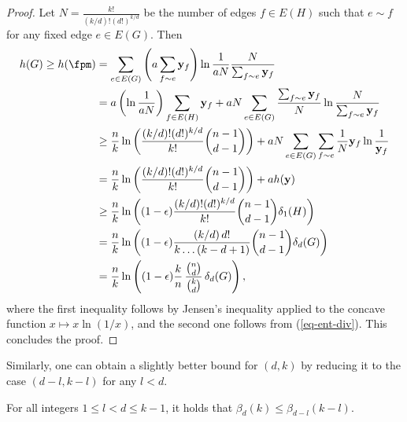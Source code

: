 \documentclass[11pt]{article}
\newcommand{\fpmy}{\mathbf{y}}
\begin{document}
\begin{proof}
    Let $N=\frac{k!}{(k/d)!(d!)^{k/d}}$ be the number of edges $f\in E(H)$ such that $e\sim f$ for any fixed edge $e\in E(G)$. Then
    \begin{align*}
        h(G) \ge h(\fpm) &= \sum_{e\in E(G)}\Bigg( a\sum_{f\sim e}\fpmy_f\Bigg)\ln\frac{1}{aN }\frac{N }{\sum_{f\sim e}\fpmy_f} \\
        &= a\left(\ln\frac{1}{aN}\right)\sum_{f\in E(H)}\fpmy_f + aN\sum_{e\in E(G)} \frac{\sum_{f\sim e}\fpmy_f }{N}\ln\frac{N }{\sum_{f\sim e}\fpmy_f} \\
        &\ge \frac{n}{k}\ln\left(\frac{(k/d)!(d!)^{k/d}}{k!}\binom{n-1}{d-1}\right) + aN\sum_{e\in E(G)}\sum_{f\sim e}\frac{1}{N }\fpmy_f\ln\frac{1}{\fpmy_f} \\
        &= \frac{n}{k}\ln\left(\frac{(k/d)!(d!)^{k/d}}{k!}\binom{n-1}{d-1}\right) + ah(\fpmy) \\
        &\ge \frac{n}{k}\ln\left((1-\epsilon)\frac{(k/d)!(d!)^{k/d}}{k!}\binom{n-1}{d-1}\delta_1(H)\right) \\
        &= \frac{n }{k }\ln\left((1-\epsilon)\frac{(k/d)\,d!}{k\dots(k-d+1)}\binom{n-1}{d-1}\delta_d(G)\right) \\
        &= \frac{n}{k}\ln\left((1-\epsilon)\frac{k}{n}\,\frac{\binom{n}{d}}{\binom{k}{d}}\,\delta_d(G)\right),
    \end{align*}
    where the first inequality follows by Jensen's inequality applied to the concave function $x\mapsto x\ln(1/x)$, and the second one follows from (\ref{eq-ent-div}). This concludes the proof.
\end{proof}

Similarly, one can obtain a slightly better bound for $(d,k)$ by reducing it to the case $(d-l,k-l)$ for any $l<d$.

\begin{theorem}\label{thm-ent-sub}
    For all integers $1\le l < d \le k-1$, it holds that $\beta_d(k)\le \beta_{d-l}(k-l)$.
\end{theorem}
\end{document}
